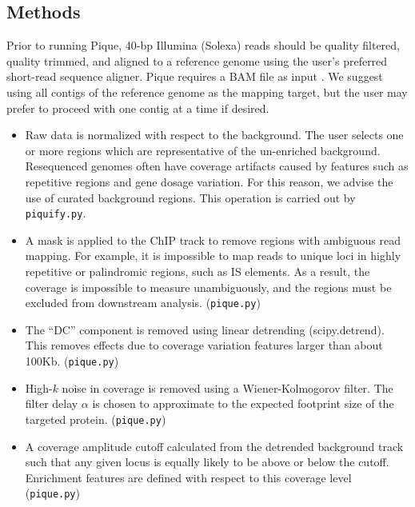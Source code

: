\documentclass{bioinfo}
\begin{document}
\begin{methods}
\section{Methods}

\noindent Prior to running Pique, 40-bp Illumina (Solexa) reads should
be quality filtered, quality trimmed, and aligned to a reference
genome using the user's preferred short-read sequence aligner. Pique
requires a BAM file as input \cite{sam_format}. We suggest using all
contigs of the reference genome as the mapping target, but the user
may prefer to proceed with one contig at a time if desired. 

\begin{itemize}



\item Raw data is normalized with respect to the background. The user
  selects one or more regions which are representative of the
  un-enriched background. Resequenced genomes often have coverage
  artifacts caused by features such as repetitive regions and gene
  dosage variation. For this reason, we advise the use of curated
  background regions. This operation is carried out by
  \texttt{piquify.py}.

\item A mask is applied to the ChIP track to remove regions with
  ambiguous read mapping. For example, it is impossible to map reads
  to unique loci in highly repetitive or palindromic regions, such as
  IS elements. As a result, the coverage is impossible to measure
  unambiguously, and the regions must be excluded from downstream
  analysis. (\texttt{pique.py})

\item The ``DC'' component is removed using linear detrending
  (scipy.detrend). This removes effects due to coverage variation
  features larger than about 100Kb. (\texttt{pique.py})

\item High-$k$ noise in coverage is removed using a Wiener-Kolmogorov
  filter. The filter delay $\alpha$ is chosen to approximate to the
  expected footprint size of the targeted protein. (\texttt{pique.py})

\item A coverage amplitude cutoff calculated from the detrended
  background track such that any given locus is equally likely to be
  above or below the cutoff. Enrichment features are defined with
  respect to this coverage level (\texttt{pique.py})


\end{itemize}
\end{methods}
\end{document}
